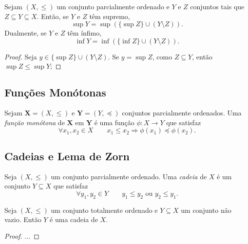 \begin{prop}
	Sejam $(X,\leq)$ um conjunto parcialmente ordenado e $Y$ e $Z$ conjuntos tais que $Z \subseteq Y \subseteq X$. Então, se $Y$ e $Z$ têm supremo,
	\begin{equation*}
	\sup Y = \sup(\{\sup Z\} \cup (Y \setminus Z)).
	\end{equation*}
Dualmente, se $Y$ e $Z$ têm ínfimo,
	\begin{equation*}
	\inf Y = \inf(\{\inf Z\} \cup (Y \setminus Z)).
	\end{equation*}
\end{prop}
\begin{proof}
	Seja $y \in \{\sup Z\} \cup (Y \setminus Z)$. Se $y = \sup Z$, como $Z \subseteq Y$, então $\sup Z \leq \sup Y$; 
\end{proof}

\subsection{Funções Monótonas}

\begin{defi}
	Sejam $\bm X = (X,\leq)$ e $\bm Y = (Y,\preceq)$ conjuntos parcialmente ordenados. Uma \emph{função monótona} de $\bm X$ em $\bm Y$ é uma função $\phi:X \to Y$ que satisfaz
	\begin{equation*}
	\forall x_1,x_2 \in X \qquad x_1 \leq x_2 \Rightarrow \phi(x_1) \preceq \phi(x_2).
	\end{equation*}
\end{defi}

\subsection{Cadeias e Lema de Zorn}

\begin{defi}
	Seja $(X,\leq)$ um conjunto parcialmente ordenado. Uma \emph{cadeia} de $X$ é um conjunto $Y \subseteq X$ que satisfaz
	\begin{equation*}
	\forall y_1,y_2 \in Y \qquad y_1 \leq y_2 \text{\ \ ou\ \ } y_2 \leq y_1.
	\end{equation*}
\end{defi}

\begin{prop}
	Seja $(X,\leq)$ um conjunto totalmente ordenado e $Y \subseteq X$ um conjunto não vazio. Então $Y$ é uma cadeia de $X$.
\end{prop}
\begin{proof}
...
\end{proof}

